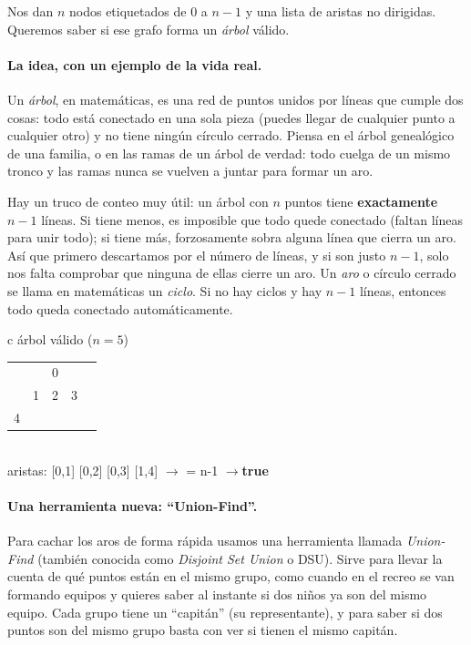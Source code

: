 
Nos dan $n$ nodos etiquetados de $0$ a $n-1$ y una lista de aristas no
dirigidas. Queremos saber si ese grafo forma un \emph{árbol} válido.

\paragraph{La idea, con un ejemplo de la vida real.} Un \emph{árbol}, en
matemáticas, es una red de puntos unidos por líneas que cumple dos cosas: todo
está conectado en una sola pieza (puedes llegar de cualquier punto a cualquier
otro) y no tiene ningún círculo cerrado. Piensa en el árbol genealógico de una
familia, o en las ramas de un árbol de verdad: todo cuelga de un mismo tronco y
las ramas nunca se vuelven a juntar para formar un aro.

Hay un truco de conteo muy útil: un árbol con $n$ puntos tiene
\textbf{exactamente} $n-1$ líneas. Si tiene menos, es imposible que todo quede
conectado (faltan líneas para unir todo); si tiene más, forzosamente sobra
alguna línea que cierra un aro. Así que primero descartamos por el número de
líneas, y si son justo $n-1$, solo nos falta comprobar que ninguna de ellas
cierre un aro. Un \emph{aro} o círculo cerrado se llama en matemáticas un
\emph{ciclo}. Si no hay ciclos y hay $n-1$ líneas, entonces todo queda
conectado automáticamente.

\begin{center}
\ttfamily
\begin{tabular}{c}
árbol válido ($n=5$)\\[2pt]
\begin{tabular}{ccccc}
 & & 0 & & \\
 & 1 & 2 & 3 & \\
 4 & & & &
\end{tabular}\\[4pt]
aristas: [0,1] [0,2] [0,3] [1,4] \quad$\to$ = n-1 \quad$\to$\quad \textbf{true}
\end{tabular}
\end{center}

\paragraph{Una herramienta nueva: ``Union-Find''.} Para cachar los aros de
forma rápida usamos una herramienta llamada \emph{Union-Find} (también conocida
como \emph{Disjoint Set Union} o DSU). Sirve para llevar la cuenta de qué puntos
están en el mismo grupo, como cuando en el recreo se van formando equipos y
quieres saber al instante si dos niños ya son del mismo equipo. Cada grupo tiene
un ``capitán'' (su representante), y para saber si dos puntos son del mismo
grupo basta con ver si tienen el mismo capitán.

